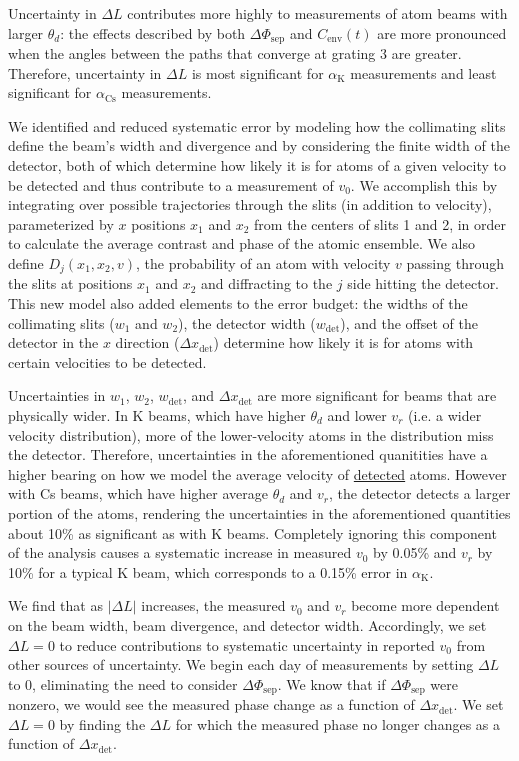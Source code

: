 \documentclass[twocolumn,prl,showpacs,superscriptaddress]{revtex4-1}   %
\newcommand{\ak}{\alpha_{\textrm{K}}}
\newcommand{\acs}{\alpha_{\textrm{Cs}}}
\newcommand{\dphisep}{\Delta\Phi_{\mathrm{sep}}}
\newcommand{\cenv}{C_{\mathrm{env}}}
\begin{document}
Uncertainty in $\Delta L$ contributes more highly to measurements of atom beams with larger $\theta_d$: the effects described by both $\dphisep$ and $\cenv(t)$ are more pronounced when the angles between the paths that converge at grating 3 are greater. Therefore, uncertainty in $\Delta L$ is most significant for $\ak$ measurements and least significant for $\acs$ measurements.

We identified and reduced systematic error by modeling how the collimating slits define the beam's width and divergence and by considering the finite width of the detector, both of which determine how likely it is for atoms of a given velocity to be detected and thus contribute to a measurement of $v_0$. 
We accomplish this by integrating over possible trajectories through the slits (in addition to velocity), parameterized by $x$ positions $x_1$ and $x_2$ from the centers of slits 1 and 2, in order to calculate the average contrast and phase of the atomic ensemble. We also define $D_j(x_1,x_2,v)$, the probability of an atom with velocity $v$ passing through the slits at positions $x_1$ and $x_2$ and diffracting to the $j$ side hitting the detector.
This new model also added elements to the error budget: the widths of the collimating slits ($w_1$ and $w_2$), the detector width ($w_{\mathrm{det}}$), and the offset of the detector in the $x$ direction ($\Delta x_{\mathrm{det}}$) determine how likely it is for atoms with certain velocities to be detected. 

Uncertainties in $w_1$, $w_2$, $w_{\mathrm{det}}$, and $\Delta x_{\mathrm{det}}$ are more significant for beams that are physically wider. 
In K beams, which have higher $\theta_d$ and lower $v_r$ (i.e. a wider velocity distribution), more of the lower-velocity atoms in the distribution miss the detector. Therefore, uncertainties in the aforementioned quanitities have a higher bearing on how we model the average velocity of \underline{detected} atoms. However with Cs beams, which have higher average $\theta_d$ and $v_r$, the detector detects a larger portion of the atoms, rendering the uncertainties in the aforementioned quantities about 10\% as significant as with K beams.
Completely ignoring this component of the analysis causes a systematic increase in measured $v_0$ by 0.05\% and $v_r$ by 10\% for a typical K beam, which corresponds to a 0.15\% error in $\ak$.
 
We find that as $\left|\Delta L\right|$ increases, the measured $v_0$ and $v_r$ become more dependent on the beam width, beam divergence, and detector width. Accordingly, we set $\Delta L = 0$ to reduce contributions to systematic uncertainty in reported $v_0$ from other sources of uncertainty. We begin each day of measurements by setting $\Delta L$ to 0, eliminating the need to consider $\dphisep$. We know that if $\dphisep$ were nonzero, we would see the measured phase change as a function of $\Delta x_{\mathrm{det}}$. We set $\Delta L = 0$ by finding the $\Delta L$ for which the measured phase no longer changes as a function of $\Delta x_{\mathrm{det}}$.
\end{document}
